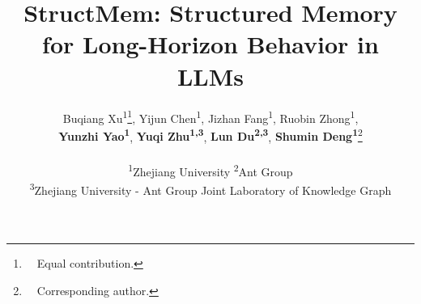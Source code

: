 \documentclass[11pt]{article}
\title{StructMem: Structured Memory for Long-Horizon Behavior in LLMs}
\author{
  Buqiang Xu\textsuperscript{1}\thanks{ \ \ Equal contribution.},
  Yijun Chen\textsuperscript{1}\footnotemark[1],
  Jizhan Fang\textsuperscript{1},
  Ruobin Zhong\textsuperscript{1}, \\
  \textbf{Yunzhi Yao\textsuperscript{1}},
  \textbf{Yuqi Zhu\textsuperscript{1,3}},
  \textbf{Lun Du\textsuperscript{2,3}}, 
  \textbf{Shumin Deng\textsuperscript{1}}\thanks{ \ \ Corresponding author.}
  \\
  \\
  \textsuperscript{1}Zhejiang University
  \quad
  \textsuperscript{2}Ant Group
  \\
  \textsuperscript{3}Zhejiang University - Ant Group Joint Laboratory of Knowledge Graph \\
}
\begin{document}
\maketitle

\begin{abstract}

\end{abstract}










\appendix

\end{document}
